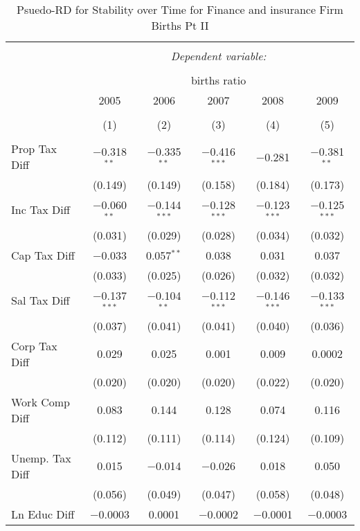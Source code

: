 
\begin{table}[!htbp] \centering 
  \caption{Psuedo-RD for Stability over Time for  Finance and insurance Firm Births Pt II} 
  \label{52year} 
\small 
\begin{tabular}{@{\extracolsep{5pt}}lccccc} 
\\[-1.8ex]\hline 
\hline \\[-1.8ex] 
 & \multicolumn{5}{c}{\textit{Dependent variable:}} \\ 
\cline{2-6} 
\\[-1.8ex] & \multicolumn{5}{c}{births ratio} \\ 
 & 2005 & 2006 & 2007 & 2008 & 2009 \\ 
\\[-1.8ex] & (1) & (2) & (3) & (4) & (5)\\ 
\hline \\[-1.8ex] 
 Prop Tax Diff & $-$0.318$^{**}$ & $-$0.335$^{**}$ & $-$0.416$^{***}$ & $-$0.281 & $-$0.381$^{**}$ \\ 
  & (0.149) & (0.149) & (0.158) & (0.184) & (0.173) \\ 
  Inc Tax Diff & $-$0.060$^{**}$ & $-$0.144$^{***}$ & $-$0.128$^{***}$ & $-$0.123$^{***}$ & $-$0.125$^{***}$ \\ 
  & (0.031) & (0.029) & (0.028) & (0.034) & (0.032) \\ 
  Cap Tax Diff & $-$0.033 & 0.057$^{**}$ & 0.038 & 0.031 & 0.037 \\ 
  & (0.033) & (0.025) & (0.026) & (0.032) & (0.032) \\ 
  Sal Tax Diff & $-$0.137$^{***}$ & $-$0.104$^{**}$ & $-$0.112$^{***}$ & $-$0.146$^{***}$ & $-$0.133$^{***}$ \\ 
  & (0.037) & (0.041) & (0.041) & (0.040) & (0.036) \\ 
  Corp Tax Diff & 0.029 & 0.025 & 0.001 & 0.009 & 0.0002 \\ 
  & (0.020) & (0.020) & (0.020) & (0.022) & (0.020) \\ 
  Work Comp Diff & 0.083 & 0.144 & 0.128 & 0.074 & 0.116 \\ 
  & (0.112) & (0.111) & (0.114) & (0.124) & (0.109) \\ 
  Unemp. Tax Diff & 0.015 & $-$0.014 & $-$0.026 & 0.018 & 0.050 \\ 
  & (0.056) & (0.049) & (0.047) & (0.058) & (0.048) \\ 
  Ln Educ Diff & $-$0.0003 & 0.0001 & $-$0.0002 & $-$0.0001 & $-$0.0003 \\ 

\end{tabular}
\end{table}
